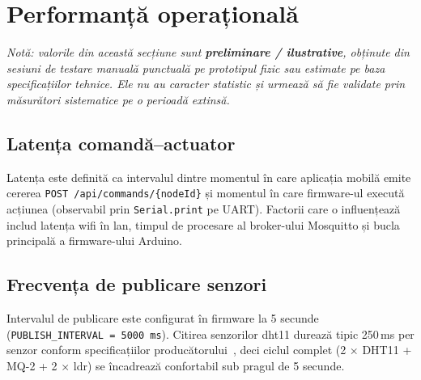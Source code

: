 \section{Performanță operațională}
\label{sec:performanta}

\textit{Notă: valorile din această secțiune sunt \textbf{preliminare / ilustrative}, obținute
din sesiuni de testare manuală punctuală pe prototipul fizic sau estimate pe baza specificațiilor
tehnice. Ele nu au caracter statistic și urmează să fie validate prin măsurători sistematice pe
o perioadă extinsă.}

\subsection{Latența comandă–actuator}

Latența este definită ca intervalul dintre momentul în care aplicația mobilă emite cererea
\texttt{POST /api/commands/\{nodeId\}} și momentul în care firmware-ul execută acțiunea (observabil
prin \texttt{Serial.print} pe UART). Factorii care o influențează includ latența \gls{wifi} în
\gls{lan}, timpul de procesare al broker-ului Mosquitto și bucla principală a firmware-ului
Arduino.

\subsection{Frecvența de publicare senzori}

Intervalul de publicare este configurat în firmware la 5 secunde (\texttt{PUBLISH\_INTERVAL = 5000\,ms}).
Citirea senzorilor \gls{dht}11 durează tipic 250\,ms per senzor conform specificațiilor
producătorului~\cite{aosong2019dht11}, deci ciclul complet (2 × DHT11 + MQ-2 + 2 × \gls{ldr})
se încadrează confortabil sub pragul de 5 secunde.

